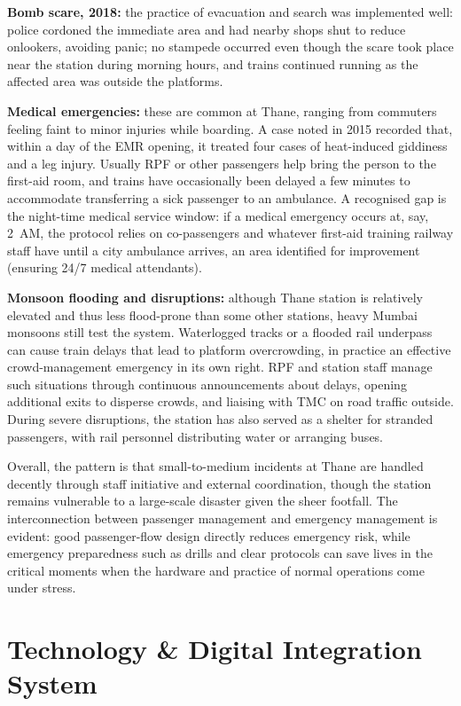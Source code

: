 \documentclass[11pt]{article}
\begin{document}
\textbf{Bomb scare, 2018:} the practice of evacuation and search was implemented well: police
cordoned the immediate area and had nearby shops shut to reduce onlookers, avoiding panic; no
stampede occurred even though the scare took place near the station during morning hours, and
trains continued running as the affected area was outside the platforms.

\textbf{Medical emergencies:} these are common at Thane, ranging from commuters feeling faint to
minor injuries while boarding. A case noted in 2015 recorded that, within a day of the EMR
opening, it treated four cases of heat-induced giddiness and a leg injury. Usually RPF or other
passengers help bring the person to the first-aid room, and trains have occasionally been
delayed a few minutes to accommodate transferring a sick passenger to an ambulance. A recognised
gap is the night-time medical service window: if a medical emergency occurs at, say, 2~AM, the
protocol relies on co-passengers and whatever first-aid training railway staff have until a city
ambulance arrives, an area identified for improvement (ensuring 24/7 medical attendants).

\textbf{Monsoon flooding and disruptions:} although Thane station is relatively elevated and
thus less flood-prone than some other stations, heavy Mumbai monsoons still test the system.
Waterlogged tracks or a flooded rail underpass can cause train delays that lead to platform
overcrowding, in practice an effective crowd-management emergency in its own right. RPF and
station staff manage such situations through continuous announcements about delays, opening
additional exits to disperse crowds, and liaising with TMC on road traffic outside. During
severe disruptions, the station has also served as a shelter for stranded passengers, with rail
personnel distributing water or arranging buses.

Overall, the pattern is that small-to-medium incidents at Thane are handled decently through
staff initiative and external coordination, though the station remains vulnerable to a
large-scale disaster given the sheer footfall. The interconnection between passenger management
and emergency management is evident: good passenger-flow design directly reduces emergency
risk, while emergency preparedness such as drills and clear protocols can save lives in the
critical moments when the hardware and practice of normal operations come under stress.

\section{Technology \& Digital Integration System}
\end{document}
